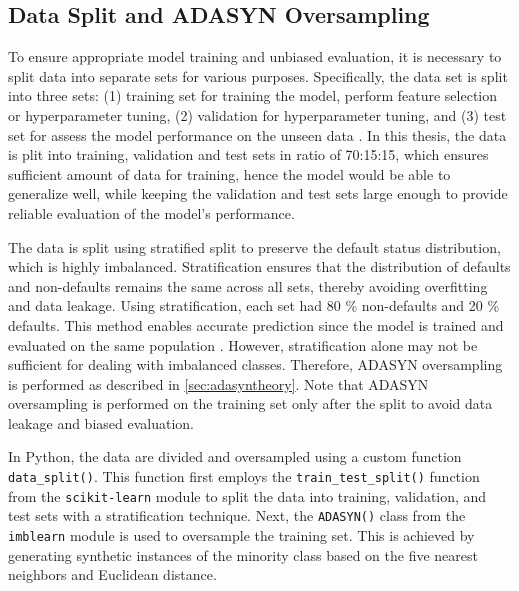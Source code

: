\subsection{Data Split and ADASYN Oversampling}
\label{subsec:data-split-ADASYN}

To ensure appropriate model training and unbiased evaluation, it is necessary to split data into separate sets for various purposes. Specifically, the data set is split into three sets: (1) training set for training the model, perform feature selection or hyperparameter tuning, (2) validation for hyperparameter tuning, and (3) test set for assess the model performance on the unseen data \citep{subasi2020practical}.
In this thesis, the data is plit into training, validation and test sets in ratio of 70:15:15, which ensures sufficient amount of data for training, hence the model would be able to generalize well, while keeping the validation and test sets large enough to provide reliable evaluation of the model's performance.

The data is split using stratified split to preserve the default status distribution, which is highly imbalanced.
Stratification ensures that the distribution of defaults and non-defaults remains the same across all sets, thereby avoiding overfitting and data leakage. Using stratification, each set had 80 \% non-defaults and 20 \% defaults. This method enables accurate prediction since the model is trained and evaluated on the same population \citep{igareta2021strat}.
However, stratification alone may not be sufficient for dealing with imbalanced classes. Therefore, ADASYN oversampling is performed as described in \autoref{sec:adasyntheory}. Note that ADASYN oversampling is performed on the training set only after the split to avoid data leakage and biased evaluation.

In Python, the data are divided and oversampled using a custom function \lstinline{data_split()}.
This function first employs the \lstinline{train_test_split()} function from the \lstinline{scikit-learn} module to split the data into training, validation, and test sets with a stratification technique.
Next, the \lstinline{ADASYN()} class from the \lstinline{imblearn} module is used to oversample the training set. This is achieved by generating synthetic instances of the minority class based on the five nearest neighbors and Euclidean distance.

